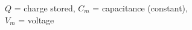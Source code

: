 \documentclass[preview]{standalone}
\begin{document}
\begin{center}
$Q$ = charge stored, $C_m$ = capacitance (constant),\\$V_m$ = voltage
\end{center}
\end{document}
